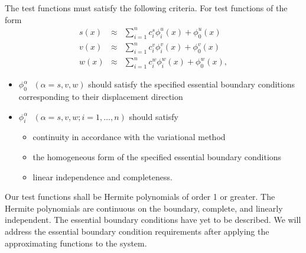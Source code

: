 The test functions must satisfy the following criteria.
For test functions of the form
\begin{eqnarray}
s(x) &\approx& \sum_{i=1}^nc_i^s\phi_i^u(x) + \phi_0^u(x) \\
v(x) &\approx& \sum_{i=1}^nc_i^v\phi_i^v(x) + \phi_0^v(x) \\
w(x) &\approx& \sum_{i=1}^nc_i^w\phi_i^w(x) + \phi_0^w(x),
\end{eqnarray}
\begin{itemize}
\item $\phi_0^\alpha \text{ } (\alpha = s,v,w)$ should satisfy the specified essential boundary conditions corresponding to their displacement direction
\item $\phi_i^\alpha \text{ } (\alpha = s,v,w; i = 1,\dots,n)$ should satisfy 
\begin{itemize}
\item continuity in accordance with the variational method
\item the homogeneous form of the specified essential boundary conditions
\item linear independence and completeness.
\end{itemize}
\end{itemize}

Our test functions shall be Hermite polynomials of order 1 or greater. The Hermite polynomials are continuous on the boundary, complete, and linearly independent. The essential boundary conditions have yet to be described. We will address the essential boundary condition requirements after applying the approximating functions to the system.

